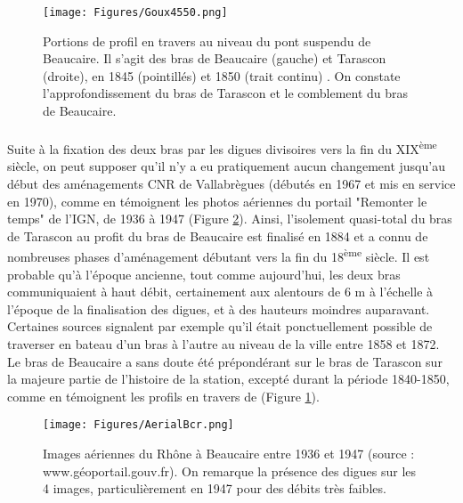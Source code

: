 \documentclass[11pt]{article}
\begin{document}
        \begin{figure}[h]
            \centering
            \texttt{[image: Figures/Goux4550.png]}
            \caption{Portions de profil en travers au niveau du pont suspendu de Beaucaire. Il s'agit des bras de Beaucaire (gauche) et Tarascon (droite), en 1845 (pointillés) et 1850 (trait continu) \citep{goux_modification_1851}. On constate l'approfondissement du bras de Tarascon et le comblement du bras de Beaucaire.}
            \label{fig:ProfGoux}
        \end{figure}
%            
            
\FloatBarrier
        \paragraph{} Suite à la fixation des deux bras par les digues divisoires vers la fin du XIX\textsuperscript{ème} siècle, on peut supposer qu'il n'y a eu pratiquement aucun changement jusqu'au début des aménagements CNR de Vallabrègues (débutés en 1967 et mis en service en 1970), comme en témoignent les photos aériennes du portail "Remonter le temps" de l'IGN, de 1936 à 1947 (Figure \ref{fig:AerialBcr}). Ainsi, l'isolement quasi-total du bras de Tarascon au profit du bras de Beaucaire est finalisé en 1884 et a connu de nombreuses phases d'aménagement débutant vers la fin du 18\textsuperscript{ème} siècle. Il est probable qu'à l'époque ancienne, tout comme aujourd'hui, les deux bras communiquaient à haut débit, certainement aux alentours de 6 m à l'échelle à l'époque de la finalisation des digues, et à des hauteurs moindres auparavant. Certaines sources signalent par exemple qu'il était ponctuellement possible de traverser en bateau d'un bras à l'autre au niveau de la ville entre 1858 et 1872. Le bras de Beaucaire a sans doute été prépondérant sur le bras de Tarascon sur la majeure partie de l'histoire de la station, excepté durant la période 1840-1850, comme en témoignent les profils en travers de \citet{goux_modification_1851} (Figure \ref{fig:ProfGoux}).
    
        \begin{figure}[h]
            \centering
        	\texttt{[image: Figures/AerialBcr.png]}
            \caption{Images aériennes du Rhône à Beaucaire entre 1936 et 1947 (source : www.géoportail.gouv.fr). On remarque la présence des digues sur les 4 images, particulièrement en 1947 pour des débits très faibles.}
            \label{fig:AerialBcr}
        \end{figure}
    
\end{document}
